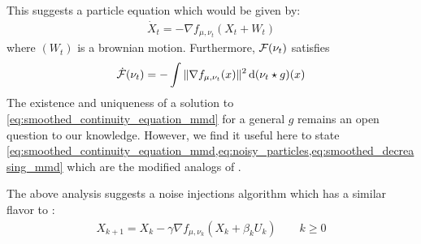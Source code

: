 This suggests a particle equation which would be given by:
\begin{align}\label{eq:noisy_particles}
	\dot{X}_t = -\nabla f_{\mu,\nu_t}( X_t + W_t  )
\end{align}
where $(W_t)$ is a brownian motion. Furthermore, ${{\mathcal F}}(\nu_t)$ satisfies
\begin{align}\label{eq:smoothed_decreasing_mmd}
	\dot{{{\mathcal F}}}(\nu_t) = -\int \Vert \nabla f_{\mu,\nu_t}(x)\Vert^2 \mathop{}\!\mathrm{d} (\nu_t\star g)(x)
\end{align}
The existence and uniqueness of a solution to \cref{eq:smoothed_continuity_equation_mmd} for a general $g$ remains an open question to our knowledge. However, we find it useful here to state \cref{eq:smoothed_continuity_equation_mmd,eq:noisy_particles,eq:smoothed_decreasing_mmd} which are the modified analogs of .

The above analysis suggests a noise injections algorithm which has a similar flavor to :
\begin{align}\label{eq:discretized_noisy_flow}
	X_{k+1} = X_{k} -\gamma \nabla f_{\mu,\nu_k}(X_k+ \beta_k U_k) \qquad k\geq 0
\end{align}

